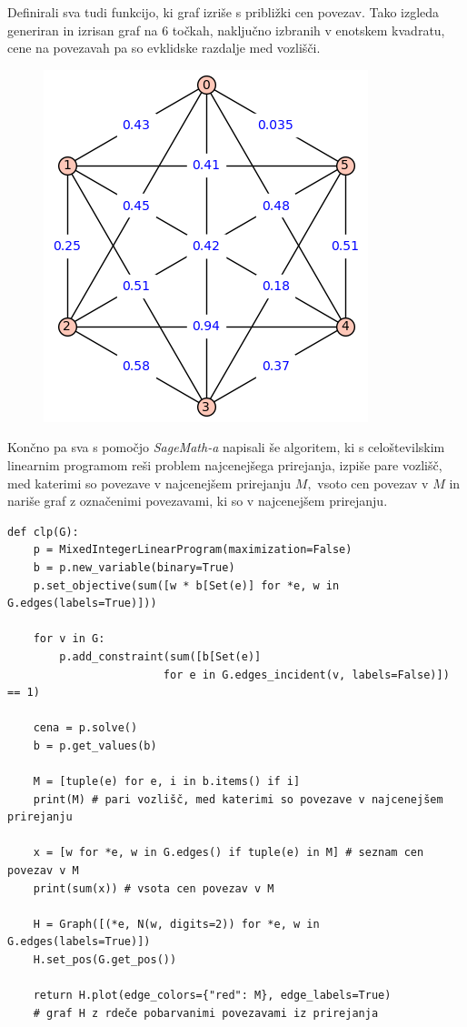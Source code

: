 \documentclass[a4paper, 11pt]{article}
\begin{document}
Definirali sva tudi funkcijo, ki graf izriše s približki cen povezav.
Tako izgleda generiran in izrisan graf na $6$ točkah, naključno izbranih v enotskem kvadratu, cene na povezavah pa so evklidske razdalje med vozlišči.
\begin{figure}[h!]
    \includegraphics[scale=0.5]{graf1}
    \centering
\end{figure}

Končno pa sva s pomočjo \emph{SageMath-a} napisali še algoritem, ki s celoštevilskim linearnim programom
reši problem najcenejšega prirejanja, izpiše pare vozlišč, med katerimi so povezave v najcenejšem prirejanju $M,$ vsoto cen povezav v $M$ in nariše graf 
z označenimi povezavami, ki so v najcenejšem prirejanju.

\begin{verbatim}
def clp(G):
    p = MixedIntegerLinearProgram(maximization=False)
    b = p.new_variable(binary=True)
    p.set_objective(sum([w * b[Set(e)] for *e, w in G.edges(labels=True)]))

    for v in G:
        p.add_constraint(sum([b[Set(e)] 
                        for e in G.edges_incident(v, labels=False)]) == 1)

    cena = p.solve()
    b = p.get_values(b)

    M = [tuple(e) for e, i in b.items() if i]
    print(M) # pari vozlišč, med katerimi so povezave v najcenejšem prirejanju

    x = [w for *e, w in G.edges() if tuple(e) in M] # seznam cen povezav v M
    print(sum(x)) # vsota cen povezav v M

    H = Graph([(*e, N(w, digits=2)) for *e, w in G.edges(labels=True)])
    H.set_pos(G.get_pos())

    return H.plot(edge_colors={"red": M}, edge_labels=True) 
    # graf H z rdeče pobarvanimi povezavami iz prirejanja
\end{verbatim}
\end{document}
